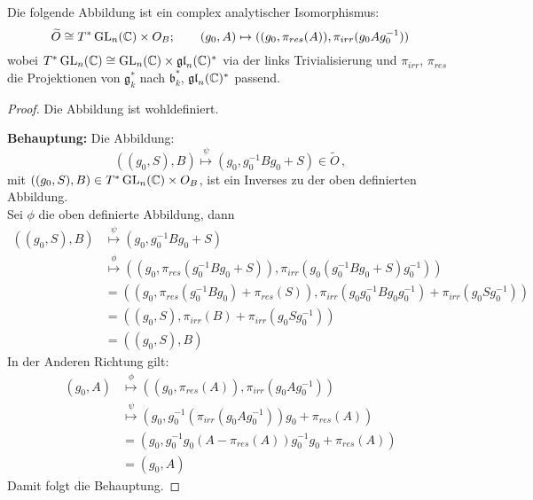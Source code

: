\begin{lem}  
Die folgende Abbildung ist ein complex analytischer Isomorphismus:
\[
\widetilde O\cong T^*\operatorname{GL}_n(\mathbb{C})\times O_B;\qquad
  (g_0,A)\mapsto ((g_0,\pi_{res}(A)),\pi_{irr}(g_0Ag_0^{-1}))
\]
wobei $T^*\operatorname{GL}_n(\mathbb{C})\cong \operatorname{GL}_n(\mathbb{C})\times\mathfrak{gl}_n(\mathbb{C})^*$ via der links
Trivialisierung und $\pi_{irr}$, $\pi_{res}$ die Projektionen von $\mathfrak
g_k^*$ nach $\mathfrak b_k^*$, $\mathfrak{gl}_n(\mathbb{C})^*$ passend.
\end{lem}
\begin{proof}
Die Abbildung ist wohldefiniert.
\begin{comment}
denn??
\end{comment}
\textbf{Behauptung:} Die Abbildung:
\[
((g_0,S),B)\overset\psi\mapsto(g_0,g_0^{-1}Bg_0+S)\in\tilde O \,,
\]
mit $((g_0,S),B)\in T^*\operatorname{GL}_n(\mathbb{C})\times O_B$, ist ein Inverses zu der oben
definierten Abbildung.\\
Sei $\phi$ die oben definierte Abbildung, dann
\begin{align*}
((g_0,S),B)&\overset\psi\mapsto(g_0,g_0^{-1}Bg_0+S)
\\&\overset\phi\mapsto((g_0,\pi_{res}(g_0^{-1}Bg_0+S)),
    \pi_{irr}(g_0(g_0^{-1}Bg_0+S)g_0^{-1}))
\\&=((g_0,\pi_{res}(g_0^{-1}Bg_0)+\pi_{res}(S)),
    \pi_{irr}( g_0g_0^{-1}Bg_0g_0^{-1})+\pi_{irr}(g_0Sg_0^{-1}))
\\&=((g_0,S), \pi_{irr}(B)+ \pi_{irr}(g_0Sg_0^{-1}))
\\&=((g_0,S), B)
\end{align*}
In der Anderen Richtung gilt:
\begin{align*}
(g_0,A)&\overset\phi\mapsto ((g_0,\pi_{res}(A)),\pi_{irr}(g_0Ag_0^{-1}))
\\&\overset\psi\mapsto (g_0,g_0^{-1}(\pi_{irr}(g_0Ag_0^{-1}))g_0+\pi_{res}(A))
\\&= (g_0,g_0^{-1}g_0(A - \pi_{res}(A))g_0^{-1}g_0+\pi_{res}(A))
\\&= (g_0,A)
\end{align*}
Damit folgt die Behauptung.
\end{proof}

